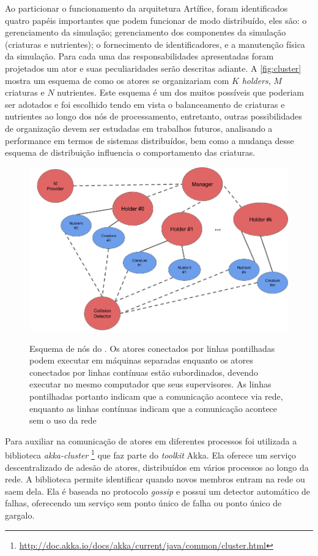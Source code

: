 Ao particionar o funcionamento da arquitetura Artífice, foram identificados quatro papéis importantes que podem funcionar de modo distribuído, eles são: o gerenciamento da simulação; gerenciamento dos componentes da simulação (criaturas e nutrientes); o fornecimento de identificadores, e a manutenção física da simulação. Para cada uma das responsabilidades apresentadas foram projetados um ator e suas peculiaridades serão descritas adiante. A \autoref{fig:cluster} mostra um esquema de como os atores se organizariam com $K$ \textit{holders}, $M$ criaturas e $N$ nutrientes. Este esquema é um dos muitos possíveis que poderiam ser adotados e foi escolhido tendo em vista o balanceamento de criaturas e nutrientes ao longo dos nós de processamento, entretanto, outras possibilidades de organização devem ser estudadas em trabalhos futuros, analisando a performance em termos de sistemas distribuídos, bem como a mudança desse esquema de distribuição influencia o comportamento das criaturas.

\begin{figure}
    \centering
    \caption{Esquema de nós do . Os atores conectados por linhas pontilhadas podem executar em máquinas separadas enquanto os atores conectados por linhas contínuas estão subordinados, devendo executar no mesmo computador que seus supervisores. As linhas pontilhadas portanto indicam que a comunicação acontece via rede, enquanto as linhas contínuas indicam que a comunicação acontece sem o uso da rede}
    \includegraphics[scale=0.5]{04-figuras/cluster.png}
    \label{fig:cluster}
\end{figure}

Para auxiliar na comunicação de atores em diferentes processos foi utilizada a biblioteca \textit{akka-cluster} \footnote{\url{http://doc.akka.io/docs/akka/current/java/common/cluster.html}} que faz parte do \textit{toolkit} Akka. Ela oferece um serviço descentralizado de adesão de atores, distribuídos em vários processos ao longo da rede. A biblioteca permite identificar quando novos membros entram na rede ou saem dela. Ela é baseada no protocolo \textit{gossip} e possui um detector automático de falhas, oferecendo um serviço sem ponto único de falha ou ponto único de gargalo.

